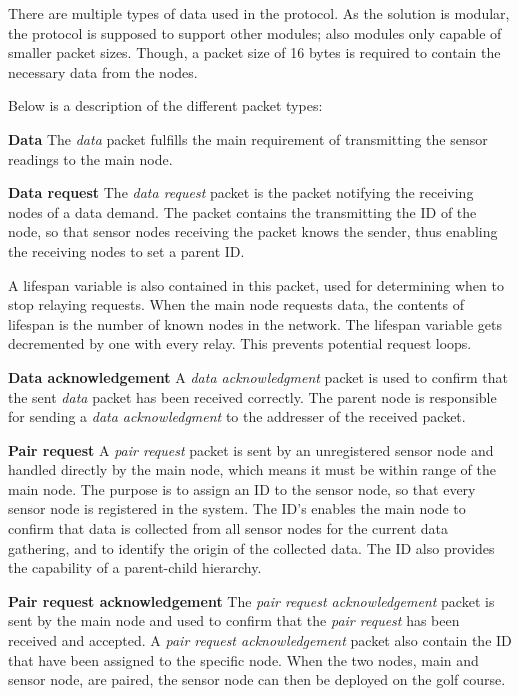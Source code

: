 There are multiple types of data used in the protocol. As the solution is modular, the protocol is supposed to support other modules; also modules only capable of smaller packet sizes. Though, a packet size of 16 bytes is required to contain the necessary data from the nodes.

Below is a description of the different packet types:

\textbf{Data}\newline
The \textit{data} packet fulfills the main requirement of transmitting the sensor readings to the main node.

\textbf{Data request}\newline 
The \textit{data request} packet is the packet notifying the receiving nodes of a data demand. 
The packet contains the transmitting the ID of the node, so that sensor nodes receiving the packet knows the sender, thus enabling the receiving nodes to set a parent ID. 

A lifespan variable is also contained in this packet, used for determining when to stop relaying requests. When the main node requests data, the contents of lifespan is the number of known nodes in the network. The lifespan variable gets decremented by one with every relay. This prevents potential request loops.

\textbf{Data acknowledgement}\newline
A \textit{data acknowledgment} packet is used to confirm that the sent \textit{data} packet has been received correctly. The parent node is responsible for sending a \textit{data acknowledgment} to the addresser of the received packet. 

\textbf{Pair request}\newline
A \textit{pair request} packet is sent by an unregistered sensor node and handled directly by the main node, which means it must be within range of the main node. The purpose is to assign an ID to the sensor node, so that every sensor node is registered in the system. The ID's enables the main node to confirm that data is collected from all sensor nodes for the current data gathering, and to identify the origin of the collected data. The ID also provides the capability of a parent-child hierarchy.

\textbf{Pair request acknowledgement}\newline
The \textit{pair request acknowledgement} packet is sent by the main node and used to confirm that the \textit{pair request} has been received and accepted. A \textit{pair request acknowledgement} packet also contain the ID that have been assigned to the specific node. When the two nodes, main and sensor node, are paired, the sensor node can then be deployed on the golf course. 

